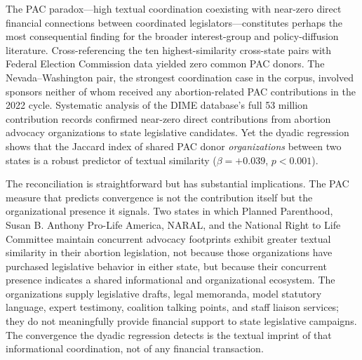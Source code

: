 The PAC paradox---high textual coordination coexisting with near-zero direct financial connections between coordinated legislators---constitutes perhaps the most consequential finding for the broader interest-group and policy-diffusion literature. Cross-referencing the ten highest-similarity cross-state pairs with Federal Election Commission data yielded zero common PAC donors. The Nevada--Washington pair, the strongest coordination case in the corpus, involved sponsors neither of whom received any abortion-related PAC contributions in the 2022 cycle. Systematic analysis of the DIME database's full 53 million contribution records confirmed near-zero direct contributions from abortion advocacy organizations to state legislative candidates. Yet the dyadic regression shows that the Jaccard index of shared PAC donor \emph{organizations} between two states is a robust predictor of textual similarity ($\beta = +0.039$, $p < 0.001$).

The reconciliation is straightforward but has substantial implications. The PAC measure that predicts convergence is not the contribution itself but the organizational presence it signals. Two states in which Planned Parenthood, Susan B. Anthony Pro-Life America, NARAL, and the National Right to Life Committee maintain concurrent advocacy footprints exhibit greater textual similarity in their abortion legislation, not because those organizations have purchased legislative behavior in either state, but because their concurrent presence indicates a shared informational and organizational ecosystem. The organizations supply legislative drafts, legal memoranda, model statutory language, expert testimony, coalition talking points, and staff liaison services; they do not meaningfully provide financial support to state legislative campaigns. The convergence the dyadic regression detects is the textual imprint of that informational coordination, not of any financial transaction.

